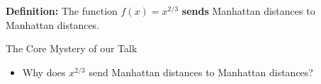 \begin{frame}
    \textbf{Definition:} The function $f(x) = x^{2/3}$ \textbf{sends}
  Manhattan distances to Manhattan distances.
\end{frame}

\begin{frame}{The Core Mystery of our Talk}
  \begin{itemize} 
    \item <+-> 
      Why does $x^{2/3}$ send Manhattan distances to
      Manhattan distances?
  \end{itemize}

\end{frame}


